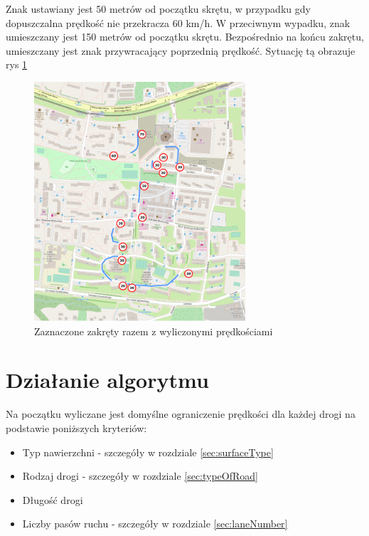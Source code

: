 Znak ustawiany jest 50 metrów od początku skrętu, w przypadku gdy dopuszczalna prędkość nie przekracza 60 km/h. W przeciwnym wypadku, znak umieszczany jest 150 metrów od początku skrętu. Bezpośrednio na końcu zakrętu, umieszczany jest znak przywracający poprzednią prędkość. Sytuację tą obrazuje rys \ref{sec:zakretySpeed}
\begin{figure}[h]
\caption{Zaznaczone zakręty razem z wyliczonymi prędkościami}
\label{sec:zakretySpeed}
\centering
\includegraphics[width=0.7\textwidth]{CurvesSpeed}
\end{figure}

\newpage
\section{Działanie algorytmu}
\label{sec:speedLimitLocalization}



Na początku wyliczane jest domyślne ograniczenie prędkości dla każdej drogi na podstawie poniższych kryteriów:
\begin{itemize}
\item Typ nawierzchni - szczegóły w rozdziale \ref{sec:surfaceType}
\item Rodzaj drogi - szczegóły w rozdziale \ref{sec:typeOfRoad}
\item Długość drogi
\item Liczby pasów ruchu - szczegóły w rozdziale \ref{sec:laneNumber}
\end{itemize}


